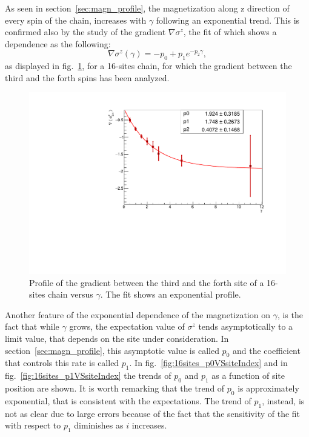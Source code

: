 As seen in section~\ref{sec:magn_profile}, the magnetization along z direction of every spin of the chain, increases with $\gamma$ following an exponential trend. This is confirmed also by the study of the gradient $\nabla \sigma^z$, the fit of which shows a dependence as the following:
\begin{equation*}
    \nabla \sigma^z (\gamma) = - p_0 + p_1 e^{-p_2\gamma},
\end{equation*}
as displayed in fig.~\ref{fig:FIT_12sites_gradLM34VSgamma}, for a 16-sites chain, for which the gradient between the third and the forth spins has been analyzed.
\begin{figure}[H]
    \centering
    \captionsetup{width=1.\linewidth}
    \includegraphics[scale=0.6]{Figures/16sites_gradLM_3and4VSgamma.pdf}
    \caption{Profile of the gradient between the third and the forth site of a 16-sites chain versus $\gamma$. The fit shows an exponential profile.}
    \label{fig:FIT_12sites_gradLM34VSgamma}
\end{figure}

Another feature of the exponential dependence of the magnetization on $\gamma$, is the fact that while $\gamma$ grows, the expectation value of $\sigma^z$ tends asymptotically to a limit value, that depends on the site under consideration. In section~\ref{sec:magn_profile}, this asymptotic value is called $p_0$ and the coefficient that controls this rate is called $p_1$. In fig.~\ref{fig:16sites_p0VSsiteIndex} and in fig.~\ref{fig:16sites_p1VSsiteIndex} the trends of $p_0$ and $p_1$ as a function of site position are shown. It is worth remarking that the trend of $p_0$ is approximately exponential, that is consistent with the expectations. The trend of $p_1$, instead, is not as clear due to large errors because of the fact that the sensitivity of the fit with respect to $p_1$ diminishes as $i$ increases. 

